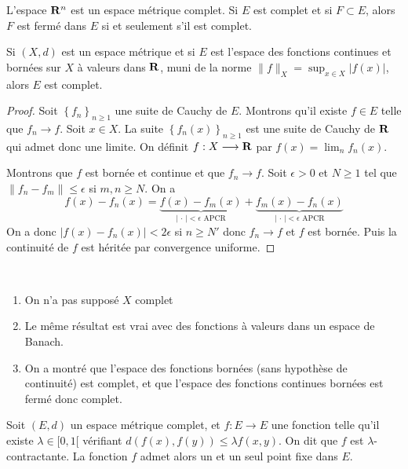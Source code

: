 \begin{ex}
L'espace $\mathbf R^{n}$ est un espace métrique complet. Si $E$ est complet et si $F \subset E$, alors $F$ est fermé dans $E$ si et seulement s'il est complet.
\end{ex}

\begin{thm}
    Si $(X, d)$ est un espace métrique et si  $E$ est l'espace des fonctions continues et bornées sur  $X$ à valeurs dans $\mathbf R$, muni de la norme $\|f\|_X= \sup_{x \in  X} |f(x)|$, alors $E$ est complet.
\end{thm}

\begin{proof}
    Soit $\left\{ f_n \right\} _{n\geq 1}$ une suite de Cauchy de $E$. Montrons qu'il existe  $f \in  E$ telle que $f_n \longrightarrow f$. Soit $x \in  X$. La suite $\left\{ f_n(x) \right\} _{n\geq 1}$ est une suite de Cauchy de $\mathbf R$ qui admet donc une limite. On définit $f:X \longrightarrow  \mathbf R$ par $f(x)=\lim_nf_n(x)$.

    Montrons que  $f$ est bornée et continue et que  $f_n \longrightarrow f$. Soit $\epsilon>0$ et $N\geq 1$ tel que $\|f_n-f_m\|\leq \epsilon$ si $m,n\geq N$. On a \[
        f(x)-f_n(x)=\underbrace{f(x)-f_m(x)}_{|\,\cdot\,|<\epsilon\text{ APCR}}+\underbrace{f_m(x)-f_n(x)}_{|\,\cdot\,|<\epsilon \text{ APCR}}
    \] 
    On a donc $|f(x)-f_n(x)|<2\epsilon$ si $n\geq N'$ donc $f_n \longrightarrow f$ et $f$ est bornée. Puis la continuité de $f$ est héritée par convergence uniforme.
\end{proof}

\begin{rem}~
\begin{enumerate}
    \item On n'a pas supposé $X$ complet 
    \item Le même résultat est vrai avec des fonctions à valeurs dans un espace de Banach.
    \item On a montré que l'espace des fonctions bornées (sans hypothèse de continuité) est complet, et que l'espace des fonctions continues bornées est fermé donc complet.
\end{enumerate}
\end{rem}

\begin{thm}
    Soit $(E, d)$ un espace métrique complet, et  $f:E\longrightarrow E$ une fonction telle qu'il existe $\lambda \in  [0, 1[$ vérifiant $d(f(x), f(y))\leq \lambda f(x, y)$. On dit que $f$ est  $ \lambda$-contractante. La fonction $f$ admet alors un et un seul point fixe dans  $E$.
\end{thm}

